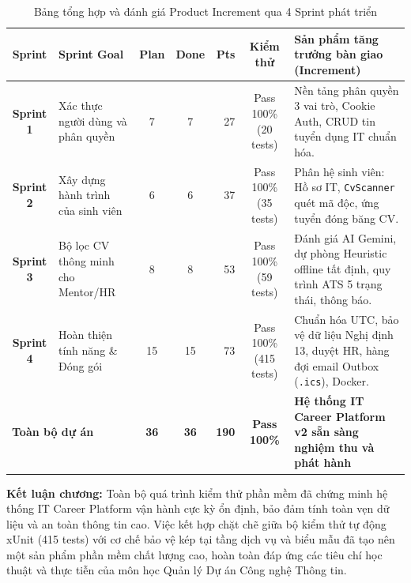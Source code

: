 \begin{table}[htbp]
\centering
\footnotesize
\caption{Bảng tổng hợp và đánh giá Product Increment qua 4 Sprint phát triển}
\label{tab:sprint-increments-eval}
\begin{tabularx}{\textwidth}{c p{2.8cm} c c r c X}
\toprule
\textbf{Sprint} & \textbf{Sprint Goal} & \textbf{Plan} & \textbf{Done} & \textbf{Pts} & \textbf{Kiểm thử} & \textbf{Sản phẩm tăng trưởng bàn giao (Increment)} \\
\midrule
\textbf{Sprint 1} & Xác thực người dùng và phân quyền & 7 & 7 & 27 & Pass 100\% (20 tests) & Nền tảng phân quyền 3 vai trò, Cookie Auth, CRUD tin tuyển dụng IT chuẩn hóa. \\
\addlinespace
\textbf{Sprint 2} & Xây dựng hành trình của sinh viên & 6 & 6 & 37 & Pass 100\% (35 tests) & Phân hệ sinh viên: Hồ sơ IT, \texttt{CvScanner} quét mã độc, ứng tuyển đóng băng CV. \\
\addlinespace
\textbf{Sprint 3} & Bộ lọc CV thông minh cho Mentor/HR & 8 & 8 & 53 & Pass 100\% (59 tests) & Đánh giá AI Gemini, dự phòng Heuristic offline tất định, quy trình ATS 5 trạng thái, thông báo. \\
\addlinespace
\textbf{Sprint 4} & Hoàn thiện tính năng \& Đóng gói & 15 & 15 & 73 & Pass 100\% (415 tests) & Chuẩn hóa UTC, bảo vệ dữ liệu Nghị định 13, duyệt HR, hàng đợi email Outbox (\texttt{.ics}), Docker. \\
\midrule
\multicolumn{2}{l}{\textbf{Toàn bộ dự án}} & \textbf{36} & \textbf{36} & \textbf{190} & \textbf{Pass 100\%} & \textbf{Hệ thống IT Career Platform v2 sẵn sàng nghiệm thu và phát hành} \\
\bottomrule
\end{tabularx}
\end{table}

\textbf{Kết luận chương:} Toàn bộ quá trình kiểm thử phần mềm đã chứng minh hệ thống IT Career Platform vận hành cực kỳ ổn định, bảo đảm tính toàn vẹn dữ liệu và an toàn thông tin cao. Việc kết hợp chặt chẽ giữa bộ kiểm thử tự động xUnit (415 tests) với cơ chế bảo vệ kép tại tầng dịch vụ và biểu mẫu đã tạo nên một sản phẩm phần mềm chất lượng cao, hoàn toàn đáp ứng các tiêu chí học thuật và thực tiễn của môn học Quản lý Dự án Công nghệ Thông tin.

